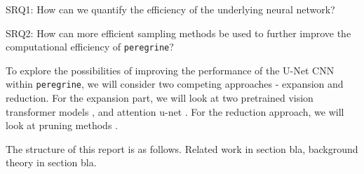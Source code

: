 \noindent SRQ1: How can we quantify the efficiency of the underlying neural network?

\noindent SRQ2: How can more efficient sampling methods be used to further improve the computational efficiency of \texttt{peregrine}?

To explore the possibilities of improving the performance of the U-Net CNN within \texttt{peregrine}, we will consider two competing approaches - expansion and reduction. For the expansion part, we will look at two pretrained vision transformer models \cite{Dosovitskiy_2021_ViT,Zerveas_2020_mvts}, and attention u-net \cite{Oktay_2018_AUNet}. For the reduction approach, we will look at pruning methods \cite{Fang_Ma_Song_Mi_Wang_2023}.

The structure of this report is as follows. Related work in section bla, background theory in section bla.